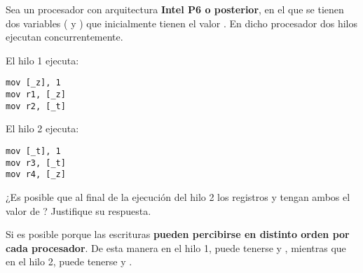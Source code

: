 \begin{acexercise}\end{acexercise}

Sea un procesador con arquitectura \textbf{Intel P6 o posterior}, en el que se
tienen dos variables ( y ) que inicialmente tienen el valor
. En dicho procesador dos hilos ejecutan concurrentemente.

El hilo 1 ejecuta:
\begin{lstlisting}[language={[x86masm]Assembler},basicstyle=\normalsize]
mov [_z], 1
mov r1, [_z]
mov r2, [_t]
\end{lstlisting}

El hilo 2 ejecuta:
\begin{lstlisting}[language={[x86masm]Assembler},basicstyle=\normalsize]
mov [_t], 1
mov r3, [_t]
mov r4, [_z]
\end{lstlisting}

¿Es posible que al final de la ejecución del hilo 2 los registros  y 
tengan ambos el valor de ? Justifique su respuesta.

\begin{acsolution}\end{acsolution}

Si es posible porque las escrituras \textbf{pueden percibirse en distinto orden
por cada procesador}. De esta manera en el hilo 1, puede tenerse  y
, mientras que en el hilo 2, puede tenerse  y
.
